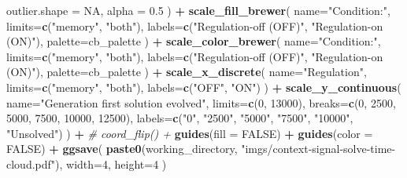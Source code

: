 \documentclass[]{book}
\newenvironment{Shaded}{\begin{snugshade}}{\end{snugshade}}
\newcommand{\CommentTok}[1]{\textcolor[rgb]{0.56,0.35,0.01}{\textit{#1}}}
\newcommand{\DataTypeTok}[1]{\textcolor[rgb]{0.13,0.29,0.53}{#1}}
\newcommand{\DecValTok}[1]{\textcolor[rgb]{0.00,0.00,0.81}{#1}}
\newcommand{\FloatTok}[1]{\textcolor[rgb]{0.00,0.00,0.81}{#1}}
\newcommand{\KeywordTok}[1]{\textcolor[rgb]{0.13,0.29,0.53}{\textbf{#1}}}
\newcommand{\NormalTok}[1]{#1}
\newcommand{\OperatorTok}[1]{\textcolor[rgb]{0.81,0.36,0.00}{\textbf{#1}}}
\newcommand{\OtherTok}[1]{\textcolor[rgb]{0.56,0.35,0.01}{#1}}
\newcommand{\StringTok}[1]{\textcolor[rgb]{0.31,0.60,0.02}{#1}}
\begin{document}
\begin{Shaded}
\begin{Highlighting}[]
    \DataTypeTok{outlier.shape =} \OtherTok{NA}\NormalTok{,}
    \DataTypeTok{alpha =} \FloatTok{0.5}
\NormalTok{  ) }\OperatorTok{+}
\StringTok{  }\KeywordTok{scale_fill_brewer}\NormalTok{(}
    \DataTypeTok{name=}\StringTok{"Condition:"}\NormalTok{,}
    \DataTypeTok{limits=}\KeywordTok{c}\NormalTok{(}\StringTok{"memory"}\NormalTok{, }\StringTok{"both"}\NormalTok{),}
    \DataTypeTok{labels=}\KeywordTok{c}\NormalTok{(}\StringTok{"Regulation-off (OFF)"}\NormalTok{, }\StringTok{"Regulation-on (ON)"}\NormalTok{),}
    \DataTypeTok{palette=}\NormalTok{cb_palette}
\NormalTok{  ) }\OperatorTok{+}
\StringTok{  }\KeywordTok{scale_color_brewer}\NormalTok{(}
    \DataTypeTok{name=}\StringTok{"Condition:"}\NormalTok{,}
    \DataTypeTok{limits=}\KeywordTok{c}\NormalTok{(}\StringTok{"memory"}\NormalTok{, }\StringTok{"both"}\NormalTok{),}
    \DataTypeTok{labels=}\KeywordTok{c}\NormalTok{(}\StringTok{"Regulation-off (OFF)"}\NormalTok{, }\StringTok{"Regulation-on (ON)"}\NormalTok{),}
    \DataTypeTok{palette=}\NormalTok{cb_palette}
\NormalTok{  ) }\OperatorTok{+}
\StringTok{  }\KeywordTok{scale_x_discrete}\NormalTok{(}
    \DataTypeTok{name=}\StringTok{"Regulation"}\NormalTok{,}
    \DataTypeTok{limits=}\KeywordTok{c}\NormalTok{(}\StringTok{"memory"}\NormalTok{, }\StringTok{"both"}\NormalTok{),}
    \DataTypeTok{labels=}\KeywordTok{c}\NormalTok{(}\StringTok{"OFF"}\NormalTok{, }\StringTok{"ON"}\NormalTok{)}
\NormalTok{  ) }\OperatorTok{+}
\StringTok{  }\KeywordTok{scale_y_continuous}\NormalTok{(}
    \DataTypeTok{name=}\StringTok{"Generation first solution evolved"}\NormalTok{,}
    \DataTypeTok{limits=}\KeywordTok{c}\NormalTok{(}\DecValTok{0}\NormalTok{, }\DecValTok{13000}\NormalTok{),}
    \DataTypeTok{breaks=}\KeywordTok{c}\NormalTok{(}\DecValTok{0}\NormalTok{, }\DecValTok{2500}\NormalTok{, }\DecValTok{5000}\NormalTok{, }\DecValTok{7500}\NormalTok{, }\DecValTok{10000}\NormalTok{, }\DecValTok{12500}\NormalTok{),}
    \DataTypeTok{labels=}\KeywordTok{c}\NormalTok{(}\StringTok{"0"}\NormalTok{, }\StringTok{"2500"}\NormalTok{, }\StringTok{"5000"}\NormalTok{, }\StringTok{"7500"}\NormalTok{, }\StringTok{"10000"}\NormalTok{, }\StringTok{"Unsolved"}\NormalTok{)}
\NormalTok{  ) }\OperatorTok{+}
\StringTok{  }\CommentTok{# coord_flip() +}
\StringTok{  }\KeywordTok{guides}\NormalTok{(}\DataTypeTok{fill =} \OtherTok{FALSE}\NormalTok{) }\OperatorTok{+}
\StringTok{  }\KeywordTok{guides}\NormalTok{(}\DataTypeTok{color =} \OtherTok{FALSE}\NormalTok{) }\OperatorTok{+}
\StringTok{  }\KeywordTok{ggsave}\NormalTok{(}
    \KeywordTok{paste0}\NormalTok{(working_directory, }\StringTok{"imgs/context-signal-solve-time-cloud.pdf"}\NormalTok{),}
    \DataTypeTok{width=}\DecValTok{4}\NormalTok{,}
    \DataTypeTok{height=}\DecValTok{4}
\NormalTok{  )}
\end{Highlighting}
\end{Shaded}
\end{document}
